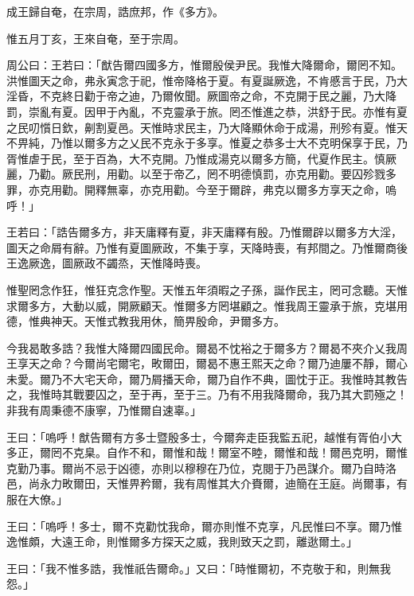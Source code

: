 
\begin{pinyinscope}
成王歸自奄，在宗周，誥庶邦，作《多方》。

惟五月丁亥，王來自奄，至于宗周。

周公曰：王若曰：「猷告爾四國多方，惟爾殷侯尹民。我惟大降爾命，爾罔不知。洪惟圖天之命，弗永寅念于祀，惟帝降格于夏。有夏誕厥逸，不肯慼言于民，乃大淫昏，不克終日勸于帝之迪，乃爾攸聞。厥圖帝之命，不克開于民之麗，乃大降罰，崇亂有夏。因甲于內亂，不克靈承于旅。罔丕惟進之恭，洪舒于民。亦惟有夏之民叨懫日欽，劓割夏邑。天惟時求民主，乃大降顯休命于成湯，刑殄有夏。惟天不畀純，乃惟以爾多方之乂民不克永于多享。惟夏之恭多士大不克明保享于民，乃胥惟虐于民，至于百為，大不克開。乃惟成湯克以爾多方簡，代夏作民主。慎厥麗，乃勸。厥民刑，用勸。以至于帝乙，罔不明德慎罰，亦克用勸。要囚殄戮多罪，亦克用勸。開釋無辜，亦克用勸。今至于爾辟，弗克以爾多方享天之命，嗚呼！」

王若曰：「誥告爾多方，非天庸釋有夏，非天庸釋有殷。乃惟爾辟以爾多方大淫，圖天之命屑有辭。乃惟有夏圖厥政，不集于享，天降時喪，有邦間之。乃惟爾商後王逸厥逸，圖厥政不蠲烝，天惟降時喪。

惟聖罔念作狂，惟狂克念作聖。天惟五年須暇之子孫，誕作民主，罔可念聽。天惟求爾多方，大動以威，開厥顧天。惟爾多方罔堪顧之。惟我周王靈承于旅，克堪用德，惟典神天。天惟式教我用休，簡畀殷命，尹爾多方。

今我曷敢多誥？我惟大降爾四國民命。爾曷不忱裕之于爾多方？爾曷不夾介乂我周王享天之命？今爾尚宅爾宅，畋爾田，爾曷不惠王熙天之命？爾乃迪屢不靜，爾心未愛。爾乃不大宅天命，爾乃屑播天命，爾乃自作不典，圖忱于正。我惟時其教告之，我惟時其戰要囚之，至于再，至于三。乃有不用我降爾命，我乃其大罰殛之！非我有周秉德不康寧，乃惟爾自速辜。」

王曰：「嗚呼！猷告爾有方多士暨殷多士，今爾奔走臣我監五祀，越惟有胥伯小大多正，爾罔不克臬。自作不和，爾惟和哉！爾室不睦，爾惟和哉！爾邑克明，爾惟克勤乃事。爾尚不忌于凶德，亦則以穆穆在乃位，克閱于乃邑謀介。爾乃自時洛邑，尚永力畋爾田，天惟畀矜爾，我有周惟其大介賚爾，迪簡在王庭。尚爾事，有服在大僚。」

王曰：「嗚呼！多士，爾不克勸忱我命，爾亦則惟不克享，凡民惟曰不享。爾乃惟逸惟頗，大遠王命，則惟爾多方探天之威，我則致天之罰，離逖爾土。」

王曰：「我不惟多誥，我惟祇告爾命。」又曰：「時惟爾初，不克敬于和，則無我怨。」


\end{pinyinscope}